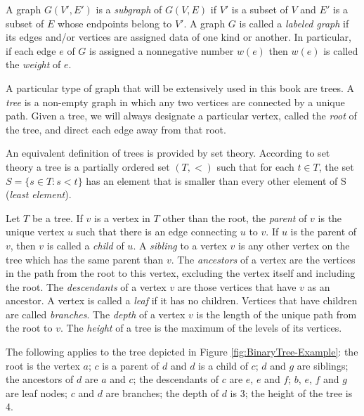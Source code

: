 A graph $G(V',E')$ is a \emph{subgraph} of $G(V,E)$ if $V'$ is a subset of $V$ and $E'$ is a subset of $E$ whose endpoints belong to $V'$. A graph $G$ is called a \emph{labeled graph} if its edges and/or vertices are assigned data of one kind or another. In particular, if each edge $e$ of $G$ is assigned a nonnegative number $w(e)$ then $w(e)$ is called the \emph{weight} of $e$.

A particular type of graph that will be extensively used in this book are trees. A \emph{tree} is a non-empty graph in which any two vertices are connected by a unique path. Given a tree, we will always designate a particular vertex, called the \emph{root} of the tree, and direct each edge away from that root.

\begin{example}
An equivalent definition of trees is provided by set theory. According to set theory a tree is a partially ordered set $(T, <)$ such that for each $t \in T$, the set $S = \{ s \in T : s < t \}$ has an element that is smaller than every other element of S (\emph{least element}).
\end{example}

Let $T$ be a tree. If $v$ is a vertex in $T$ other than the root, the \emph{parent} of $v$ is the unique vertex $u$ such that there is an edge connecting $u$ to $v$. If $u$ is the parent of $v$, then $v$ is called a \emph{child} of $u$. A \emph{sibling} to a vertex $v$ is any other vertex on the tree which has the same parent than $v$. The \emph{ancestors} of a vertex are the vertices in the path from the root to this vertex, excluding the vertex itself and including the root. The \emph{descendants} of a vertex $v$ are those vertices that have $v$ as an ancestor. A vertex is called a \emph{leaf} if it has no children. Vertices that have children are called \emph{branches}. The \emph{depth} of a vertex $v$ is the length of the unique path from the root to $v$. The \emph{height} of a tree is the maximum of the levels of its vertices. 

\begin{example}
The following applies to the tree depicted in Figure \ref{fig:BinaryTree-Example}: the root is the vertex $a$; $c$ is a parent of $d$ and $d$ is a child of $c$; $d$ and $g$ are siblings; the ancestors of $d$ are $a$ and $c$; the descendants of $c$ are $e$, $e$ and $f$; $b$, $e$, $f$ and $g$ are leaf nodes; $c$ and $d$ are branches; the depth of $d$ is 3; the height of the tree is 4.
\end{example}

